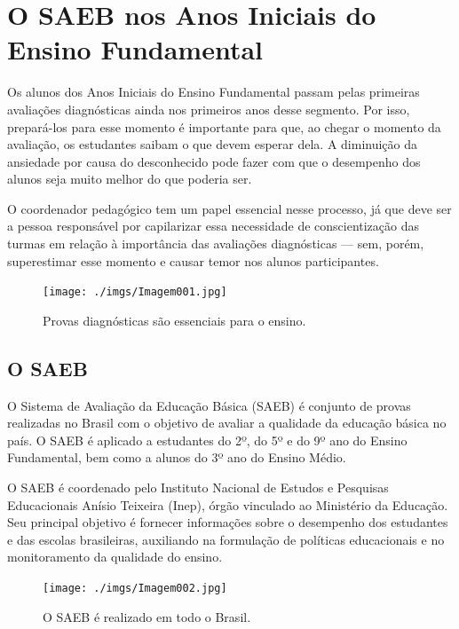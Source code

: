 \captionsetup{justification=raggedright, singlelinecheck=false}

\section{O SAEB nos Anos Iniciais do Ensino
Fundamental}

Os alunos dos Anos Iniciais do Ensino Fundamental passam pelas primeiras
avaliações diagnósticas ainda nos primeiros anos desse segmento. Por
isso, prepará-los para esse momento é importante para que, ao chegar o
momento da avaliação, os estudantes saibam o que devem esperar dela. A
diminuição da ansiedade por causa do desconhecido pode fazer com que o
desempenho dos alunos seja muito melhor do que poderia ser.

O coordenador pedagógico tem um papel essencial nesse processo, já que
deve ser a pessoa responsável por capilarizar essa necessidade de
conscientização das turmas em relação à importância das avaliações
diagnósticas --- sem, porém, superestimar esse momento e causar temor
nos alunos participantes.

\begin{figure}
\centering
\texttt{[image: ./imgs/Imagem001.jpg]}
\caption{Provas diagnósticas são essenciais para o ensino.}
\end{figure}

\subsection{O SAEB}\label{o-saeb}

O Sistema de Avaliação da Educação Básica (SAEB) é conjunto de provas
realizadas no Brasil com o objetivo de avaliar a qualidade da educação
básica no país. O SAEB é aplicado a estudantes do 2º, do 5º e do 9º ano 
do Ensino Fundamental, bem como a alunos do 3º ano do Ensino Médio.

O SAEB é coordenado pelo Instituto Nacional de Estudos e Pesquisas
Educacionais Anísio Teixeira (Inep), órgão vinculado ao Ministério da
Educação. Seu principal objetivo é fornecer informações sobre o
desempenho dos estudantes e das escolas brasileiras, auxiliando na
formulação de políticas educacionais e no monitoramento da qualidade do
ensino.

\begin{figure}
\centering
\texttt{[image: ./imgs/Imagem002.jpg]}
\caption{O SAEB é realizado em todo o Brasil.}
\end{figure}

